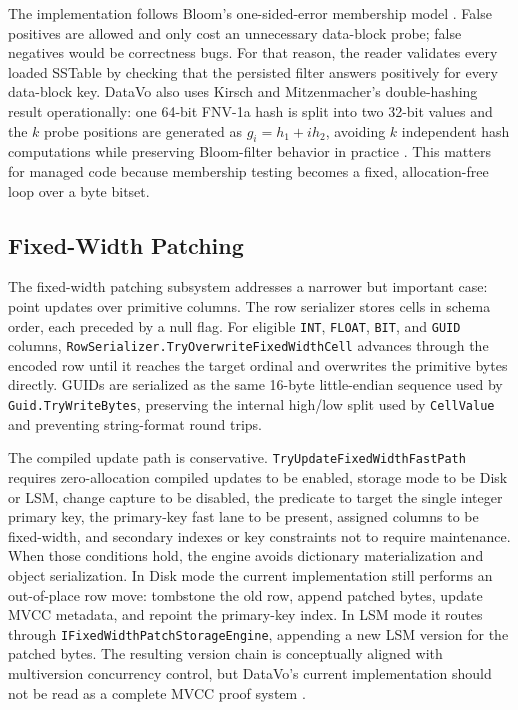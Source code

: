 \documentclass[11pt]{article}
\begin{document}
The implementation follows Bloom's one-sided-error membership model \cite{bloom}. False positives are allowed and only cost an unnecessary data-block probe; false negatives would be correctness bugs. For that reason, the reader validates every loaded SSTable by checking that the persisted filter answers positively for every data-block key. DataVo also uses Kirsch and Mitzenmacher's double-hashing result operationally: one 64-bit FNV-1a hash is split into two 32-bit values and the \(k\) probe positions are generated as \(g_i=h_1+i h_2\), avoiding \(k\) independent hash computations while preserving Bloom-filter behavior in practice \cite{less-hashing}. This matters for managed code because membership testing becomes a fixed, allocation-free loop over a byte bitset.

\subsection{Fixed-Width Patching}
The fixed-width patching subsystem addresses a narrower but important case: point updates over primitive columns. The row serializer stores cells in schema order, each preceded by a null flag. For eligible \texttt{INT}, \texttt{FLOAT}, \texttt{BIT}, and \texttt{GUID} columns, \texttt{RowSerializer.TryOverwriteFixedWidthCell} advances through the encoded row until it reaches the target ordinal and overwrites the primitive bytes directly. GUIDs are serialized as the same 16-byte little-endian sequence used by \texttt{Guid.TryWriteBytes}, preserving the internal high/low split used by \texttt{CellValue} and preventing string-format round trips.

The compiled update path is conservative. \texttt{TryUpdateFixedWidthFastPath} requires zero-allocation compiled updates to be enabled, storage mode to be Disk or LSM, change capture to be disabled, the predicate to target the single integer primary key, the primary-key fast lane to be present, assigned columns to be fixed-width, and secondary indexes or key constraints not to require maintenance. When those conditions hold, the engine avoids dictionary materialization and object serialization. In Disk mode the current implementation still performs an out-of-place row move: tombstone the old row, append patched bytes, update MVCC metadata, and repoint the primary-key index. In LSM mode it routes through \texttt{IFixedWidthPatchStorageEngine}, appending a new LSM version for the patched bytes. The resulting version chain is conceptually aligned with multiversion concurrency control, but DataVo's current implementation should not be read as a complete MVCC proof system \cite{mvcc}.
\end{document}
